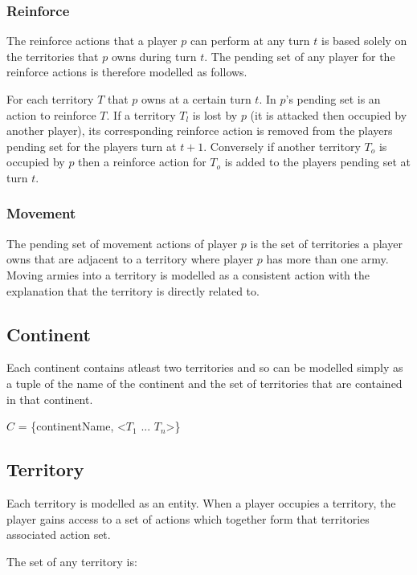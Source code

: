 \documentclass[parskip]{cs4rep}
\begin{document}
\subsubsection{Reinforce}

The reinforce actions that a player $p$ can perform at any turn $t$ is based solely on the territories that $p$ owns during turn $t$. The pending set of any player for the reinforce actions is therefore modelled as follows. 

For each territory $T$ that $p$ owns at a certain turn $t$. In $p$'s pending set is an action to reinforce $T$. If a territory $T_{l}$ is lost by $p$ (it is attacked then occupied by another player), its corresponding reinforce action is removed from the players pending set for the players turn at $t+1$. Conversely if another territory $T_{o}$ is occupied by $p$ then a reinforce action for $T_{o}$ is added to the players pending set at turn $t$.

\subsubsection{Movement}

The pending set of movement actions of player $p$ is the set of territories a player owns that are adjacent to a territory where player $p$ has more than one army. Moving armies into a territory is modelled as a consistent action with the explanation that the territory is directly related to.

\subsection{Continent}

Each continent contains atleast two territories and so can be modelled simply as a tuple of the name of the continent and the set of territories that are contained in that continent.

$C$ = \{continentName, <$T_{1}$ ... $T_{n}$>\}

\subsection{Territory}

Each territory is modelled as an entity. When a player occupies a territory, the player gains access to a set of actions which together form that territories associated action set.

The set of any territory is:
\end{document}
